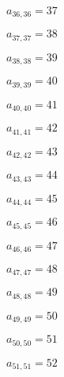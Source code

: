 \documentclass[a4paper,12pt]{article}
\begin{document}
$a _{ 36, 36 } = 37$

$a _{ 37, 37 } = 38$

$a _{ 38, 38 } = 39$

$a _{ 39, 39 } = 40$

$a _{ 40, 40 } = 41$

$a _{ 41, 41 } = 42$

$a _{ 42, 42 } = 43$

$a _{ 43, 43 } = 44$

$a _{ 44, 44 } = 45$

$a _{ 45, 45 } = 46$

$a _{ 46, 46 } = 47$

$a _{ 47, 47 } = 48$

$a _{ 48, 48 } = 49$

$a _{ 49, 49 } = 50$

$a _{ 50, 50 } = 51$

$a _{ 51, 51 } = 52$
\end{document}
